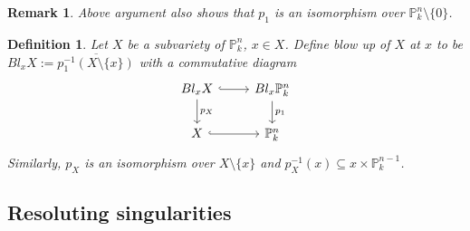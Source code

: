 \documentclass{ctexart}
\newtheorem{definition}{Definition}[section]
\newtheorem{remark}{Remark}[section]
\begin{document}
\begin{remark}
    Above argument also shows that $p_{1}$ is an isomorphism over $\mathbb{P}_{k}^{n} \setminus \{0\}$.
\end{remark}
\begin{definition}
    Let $X$ be a subvariety of $\mathbb{P}_{k}^{n}$, $x\in X$.
    Define blow up of $X$ at $x$ to be $Bl_{x}X := \overline{p_{1}^{-1}(X \setminus \{x\})}$ with a commutative diagram
    \begin{equation}
        \begin{tikzcd}
            Bl_{x}X \arrow[r, hookrightarrow] \arrow[d, "p_{X}"] &
            Bl_{x}\mathbb{P}_{k}^{n} \arrow[d, "p_{1}"] \\
            X \arrow[r, hookrightarrow] &
            \mathbb{P}_{k}^{n}
        \end{tikzcd}
    \end{equation}
    Similarly, $p_{X}$ is an isomorphism over $X \setminus \{x\}$ and $p_{X}^{-1}(x) \subseteq x \times \mathbb{P}_{k}^{n - 1}$.
\end{definition}

\subsection{Resoluting singularities}
\label{subsection:Blow_Up_Resoluting_singularities}
\end{document}
